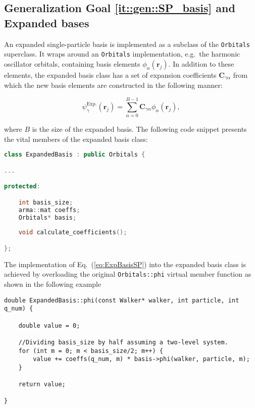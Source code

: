 \subsection{Generalization Goal \ref{it::gen::SP_basis} and Expanded bases}

An expanded single-particle basis is implemented as a subclass of the \verb+Orbitals+ superclass. It wraps around an \verb+Orbitals+ implementation, e.g.~the harmonic oscillator orbitals, containing basis elements $\phi_\alpha(\mathbf{r}_j)$. In addition to these elements, the expanded basis class has a set of expansion coefficients $\mathbf{C}_{\gamma\alpha}$ from which the new basis elements are constructed in the following manner:

\begin{equation}
\label{eq:ExpBasisSP}
 \psi_\gamma^\mathrm{Exp.}(\mathbf{r}_j) = \sum_{\alpha=0}^{B - 1} \mathbf{C}_{\gamma\alpha}\phi_\alpha(\mathbf{r}_j), 
\end{equation}

where $B$ is the size of the expanded basis. The following code snippet presents the vital members of the expanded basis class:

\vspace{0.5cm}
\begin{lstlisting}[language=C++, caption={The declaration of the expanded basis class. The vital members are the size of the basis, the expansion coefficients and another basis in which the new are expanded. A method for calculating the coefficients is present, but the actual implementation has not been a focus of this thesis.}]
class ExpandedBasis : public Orbitals {

...

protected:

    int basis_size;
    arma::mat coeffs;
    Orbitals* basis;
    
    void calculate_coefficients();

};

\end{lstlisting}


The implementation of Eq.~(\ref{eq:ExpBasisSP}) into the expanded basis class is achieved by overloading the original \verb+Orbitals::phi+ virtual member function as shown in the following example

\vspace{0.5cm}
\begin{lstlisting}[caption=The explicit implementation of the expanded basis single-particle wave function. The wave function is evaluated by expanding a given basis in a set of expansion coefficients (see the previous code example).]
double ExpandedBasis::phi(const Walker* walker, int particle, int q_num) {

    double value = 0;
    
    //Dividing basis_size by half assuming a two-level system.
    for (int m = 0; m < basis_size/2; m++) {
        value += coeffs(q_num, m) * basis->phi(walker, particle, m);
    }

    return value;

}
\end{lstlisting}

